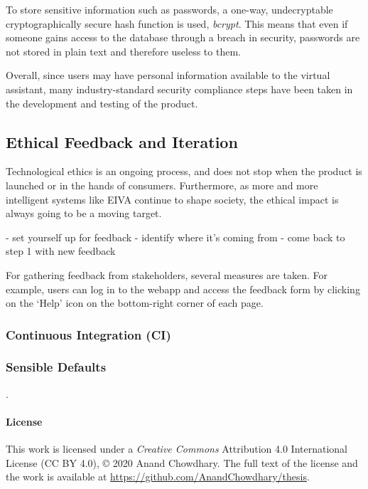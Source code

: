 \documentclass{article}
\begin{document}
To store sensitive information such as passwords, a one-way, undecryptable cryptographically secure hash function is used, \emph{bcrypt}. This means that even if someone gains access to the database through a breach in security, passwords are not stored in plain text and therefore useless to them.

Overall, since users may have personal information available to the virtual assistant, many industry-standard security compliance steps have been taken in the development and testing of the product.

\subsection{Ethical Feedback and Iteration}

Technological ethics is an ongoing process, and does not stop when the product is launched or in the hands of consumers. Furthermore, as more and more intelligent systems like EIVA continue to shape society, the ethical impact is always going to be a moving target.

- set yourself up for feedback
- identify where it's coming from
- come back to step 1 with new feedback

For gathering feedback from stakeholders, several measures are taken. For example, users can log in to the webapp and access the feedback form by clicking on the `Help' icon on the bottom-right corner of each page.

\subsubsection{Continuous Integration (CI)}

\subsubsection{Sensible Defaults}

.

\begin{multicols}{2}



	
\end{multicols}

\listoffigures

\paragraph{License}

This work is licensed under a \emph{Creative Commons} Attribution 4.0 International License (CC BY 4.0), © 2020 Anand Chowdhary. The full text of the license and the work is available at \url{https://github.com/AnandChowdhary/thesis}.
\end{document}
